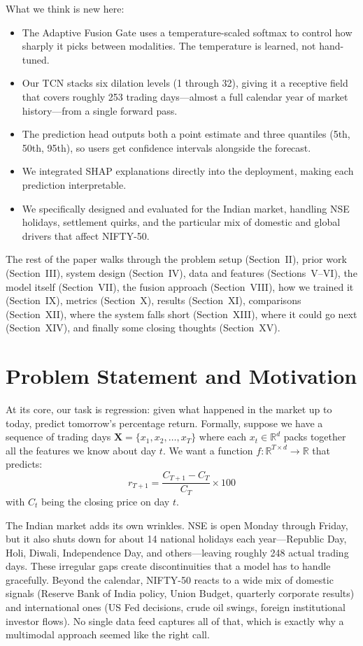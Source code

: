 \documentclass[conference]{IEEEtran}
\begin{document}
What we think is new here:
\begin{itemize}
\item The Adaptive Fusion Gate uses a temperature-scaled softmax to control how sharply it picks between modalities. The temperature is learned, not hand-tuned.
\item Our TCN stacks six dilation levels (1 through 32), giving it a receptive field that covers roughly 253 trading days---almost a full calendar year of market history---from a single forward pass.
\item The prediction head outputs both a point estimate and three quantiles (5th, 50th, 95th), so users get confidence intervals alongside the forecast.
\item We integrated SHAP explanations directly into the deployment, making each prediction interpretable.
\item We specifically designed and evaluated for the Indian market, handling NSE holidays, settlement quirks, and the particular mix of domestic and global drivers that affect NIFTY-50.
\end{itemize}

The rest of the paper walks through the problem setup (Section~II), prior work (Section~III), system design (Section~IV), data and features (Sections~V--VI), the model itself (Section~VII), the fusion approach (Section~VIII), how we trained it (Section~IX), metrics (Section~X), results (Section~XI), comparisons (Section~XII), where the system falls short (Section~XIII), where it could go next (Section~XIV), and finally some closing thoughts (Section~XV).

\section{Problem Statement and Motivation}
At its core, our task is regression: given what happened in the market up to today, predict tomorrow's percentage return. Formally, suppose we have a sequence of trading days $\mathbf{X} = \{x_1, x_2, \ldots, x_T\}$ where each $x_t \in \mathbb{R}^d$ packs together all the features we know about day $t$. We want a function $f: \mathbb{R}^{T \times d} \rightarrow \mathbb{R}$ that predicts:
\begin{equation}
r_{T+1} = \frac{C_{T+1} - C_T}{C_T} \times 100
\end{equation}
with $C_t$ being the closing price on day $t$.

The Indian market adds its own wrinkles. NSE is open Monday through Friday, but it also shuts down for about 14 national holidays each year---Republic Day, Holi, Diwali, Independence Day, and others---leaving roughly 248 actual trading days. These irregular gaps create discontinuities that a model has to handle gracefully. Beyond the calendar, NIFTY-50 reacts to a wide mix of domestic signals (Reserve Bank of India policy, Union Budget, quarterly corporate results) and international ones (US Fed decisions, crude oil swings, foreign institutional investor flows). No single data feed captures all of that, which is exactly why a multimodal approach seemed like the right call.
\end{document}
